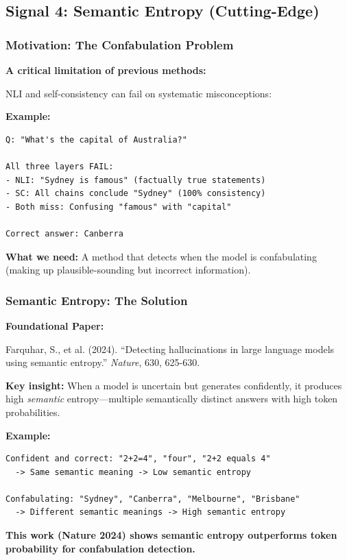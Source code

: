 \documentclass[12pt,a4paper]{article}
\theoremstyle{definition}
\begin{document}
\subsection{Signal 4: Semantic Entropy (Cutting-Edge)}

\subsubsection{Motivation: The Confabulation Problem}

\begin{problembox}
\textbf{A critical limitation of previous methods:}

NLI and self-consistency can fail on systematic misconceptions:

\textbf{Example:}
\begin{verbatim}
Q: "What's the capital of Australia?"

All three layers FAIL:
- NLI: "Sydney is famous" (factually true statements)
- SC: All chains conclude "Sydney" (100% consistency)
- Both miss: Confusing "famous" with "capital"

Correct answer: Canberra
\end{verbatim}

\textbf{What we need:} A method that detects when the model is confabulating (making up plausible-sounding but incorrect information).
\end{problembox}

\subsubsection{Semantic Entropy: The Solution}

\begin{priorworkbox}
\textbf{Foundational Paper:}

Farquhar, S., et al. (2024). ``Detecting hallucinations in large language models using semantic entropy.'' \textit{Nature}, 630, 625-630.

\textbf{Key insight:} When a model is uncertain but generates confidently, it produces high \textit{semantic} entropy—multiple semantically distinct answers with high token probabilities.

\textbf{Example:}
\begin{verbatim}
Confident and correct: "2+2=4", "four", "2+2 equals 4"
  -> Same semantic meaning -> Low semantic entropy
  
Confabulating: "Sydney", "Canberra", "Melbourne", "Brisbane"
  -> Different semantic meanings -> High semantic entropy
\end{verbatim}

\textbf{This work (Nature 2024) shows semantic entropy outperforms token probability for confabulation detection.}
\end{priorworkbox}
\end{document}
